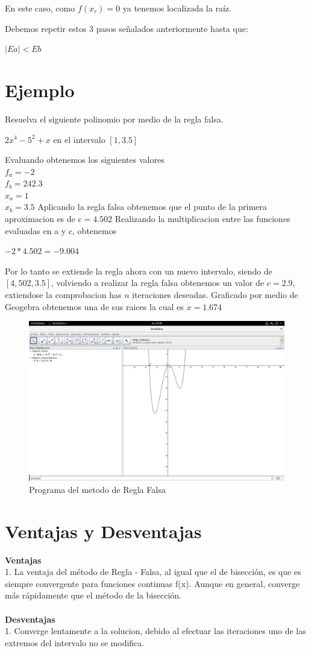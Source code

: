\documentclass{article}
\begin{document}
\begin{multicols}{2}
En este caso, como $f(x_{r})=0$ ya tenemos localizada la raíz.

 

Debemos repetir estos 3 pasos señalados anteriormente hasta que:

$|Ea|<Eb$
\section{Ejemplo}
\label{sec:Ejem}
Resuelva el siguiente polinomio por medio de la regla falsa.
\begin{center}
$2x^{4}-5^{2}+x $ en el intervalo $[1,3.5]$
\end{center}
Evaluando obtenemos los siguientes valores
\\
$f_{a}=-2$ 
\\
$f_{b}=242.3$
\\
$x_{a}=1$
\\
$x_{b}=3.5$
Aplicando la regla falsa obtenemos que el punto de la primera aproximacion es de 
$c=4.502$
Realizando la multiplicacion entre las funciones evaluadas en a y c, obtenemos 
\begin{center}
$-2*4.502=-9.004$
\end{center}
Por lo tanto se extiende la regla ahora con un nuevo intervalo, siendo de $[4,502,3.5]$, volviendo a realizar la regla falsa obtenemos un valor de $c=2.9$, extiendose la comprobacion has $n$ iteraciones deseadas.
Graficado por medio de Geogebra obtenemos una de sus raices la cual es $x=1.674$
\begin{figure}[H]
\centering
\includegraphics[scale=.125]{GeogebraFalso.png}
\caption{Programa del metodo de Regla Falsa}
\end{figure}

\section{Ventajas y Desventajas}
\textbf{Ventajas}
\\
1. La ventaja del método de Regla - Falsa, al igual que el de bisección, es que es siempre convergente para funciones continuas f(x). Aunque en general, converge más rápidamente que el método de la bisección.
\\
\\
\textbf{Desventajas}
\\
1. Converge lentamente a la solucion, debido al efectuar las iteraciones uno de las extremos del intervalo no se modifica.

\end{multicols}
\end{document}
